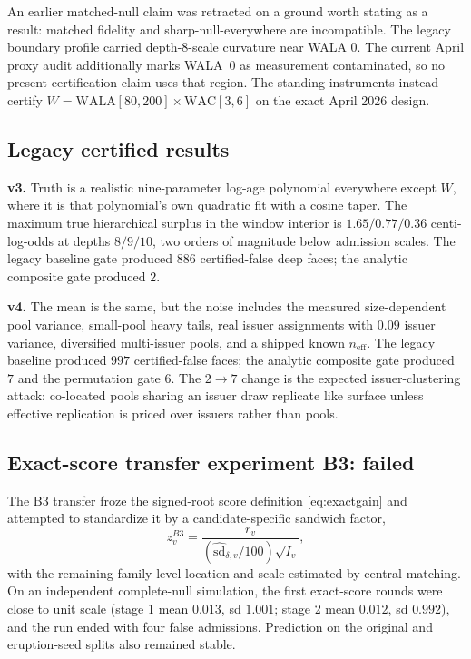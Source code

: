 \documentclass[11pt]{article}
\begin{document}
An earlier matched-null claim was retracted on a ground worth stating as a result: matched fidelity
and sharp-null-everywhere are incompatible. The legacy boundary profile carried depth-8-scale
curvature near WALA $0$. The current April proxy audit additionally marks WALA~0 as measurement contaminated, so no present certification claim uses that region. The standing
instruments instead certify
$W=\mathrm{WALA}[80,200]\times\mathrm{WAC}[3,6]$ on the exact April 2026 design.

\subsection*{Legacy certified results}
\textbf{v3.} Truth is a realistic nine-parameter log-age polynomial everywhere except $W$, where it
is that polynomial's own quadratic fit with a cosine taper. The maximum true hierarchical surplus
in the window interior is $1.65/0.77/0.36$ centi-log-odds at depths $8/9/10$, two orders of magnitude
below admission scales. The legacy baseline gate produced $886$ certified-false deep faces; the
analytic composite gate produced $2$.

\textbf{v4.} The mean is the same, but the noise includes the measured size-dependent pool variance,
small-pool heavy tails, real issuer assignments with $0.09$ issuer variance, diversified
multi-issuer pools, and a shipped known $n_{\mathrm{eff}}$. The legacy baseline produced $997$
certified-false faces; the analytic composite gate produced $7$ and the permutation gate $6$. The
$2\to7$ change is the expected issuer-clustering attack: co-located pools sharing an issuer draw
replicate like surface unless effective replication is priced over issuers rather than pools.

\subsection*{Exact-score transfer experiment B3: failed}
The B3 transfer froze the signed-root score definition \eqref{eq:exactgain} and attempted to
standardize it by a candidate-specific sandwich factor,
\begin{equation}\label{eq:b3score}
z_v^{B3}=\frac{r_v}{(\widehat{\mathrm{sd}}_{\delta,v}/100)\sqrt{I_v}},
\end{equation}
with the remaining family-level location and scale estimated by central matching. On an independent
complete-null simulation, the first exact-score rounds were close to unit scale (stage 1 mean
$0.013$, sd $1.001$; stage 2 mean $0.012$, sd $0.992$), and the run ended with four false
admissions. Prediction on the original and eruption-seed splits also remained stable.
\end{document}
